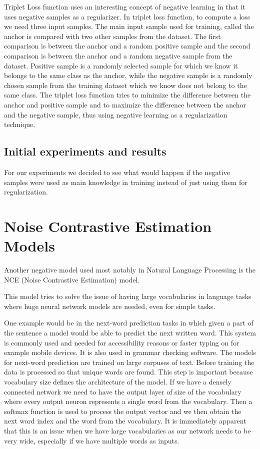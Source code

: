 \documentclass[b5paper]{book}
\begin{document}
Triplet Loss function uses an interesting concept of negative learning in that it uses negative samples as a regularizer. In triplet loss function, to compute a loss we need three input samples. The main input sample used for training, called the anchor is compared with two other samples from the dataset. The first comparison is between the anchor and a random positive sample and the second comparison is between the anchor and a random negative sample from the dataset. Positive sample is a randomly selected sample for which we know it belongs to the same class as the anchor, while the negative sample is a randomly chosen sample from the training dataset which we know does not belong to the same class. The triplet loss function tries to minimize the difference between the anchor and positive sample and to maximize the difference between the anchor and the negative sample, thus using negative learning as a regularization technique.



\section{Initial experiments and results}

For our experiments we decided to see what would happen if the negative samples were used as main knowledge in training instead of just using them for regularization. 


\chapter{Noise Contrastive Estimation Models}

Another negative model used most notably in Natural Language Processing is the NCE (Noise Contrastive Estimation) model.

This model tries to solve the issue of having large vocabularies in language tasks where huge neural network models are needed, even for simple tasks. 

One example would be in the next-word prediction tasks in which given a part of the sentence a model would be able to predict the next written word. This system is commonly used and needed for accessibility reasons or faster typing on for example mobile devices. It is also used in grammar checking software. The models for next-word prediction are trained on large corpuses of text. Before training the data is processed so that unique words are found. This step is important because vocabulary size defines the architecture of the model. If we have a densely connected network we need to have the output layer of size of the vocabulary where every output neuron represents a single word from the vocabulary. Then a softmax function is used to process the output vector and we then obtain the next word index and the word from the vocabulary. It is immediately apparent that this is an issue when we have large vocabularies as our network needs to be very wide, especially if we have multiple words as inputs. 
\end{document}
